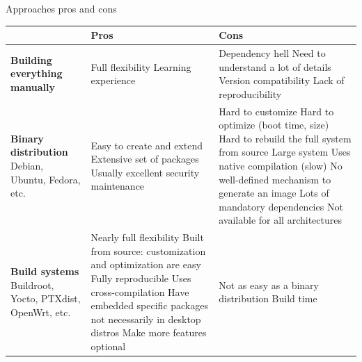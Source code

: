 \begin{frame}{Approaches pros and cons}
  \begin{center}
  \tiny
  \begin{tabularx}{13cm}{|X|X|X|}
    \hline
    & {\bf Pros} & {\bf Cons} \\
    \hline
    {\bf Building everything manually} &
    Full flexibility \newline
    Learning experience &
    Dependency hell \newline
    Need to understand a lot of details \newline
    Version compatibility \newline
    Lack of reproducibility \\
    \hline
    {\bf Binary distribution} \newline Debian, Ubuntu, Fedora, etc.
    &
    Easy to create and extend \newline
    Extensive set of packages \newline
    Usually excellent security maintenance
    &
    Hard to customize \newline
    Hard to optimize (boot time, size) \newline
    Hard to rebuild the full system from source \newline
    Large system \newline
    Uses native compilation (slow) \newline
    No well-defined mechanism to generate an image \newline
    Lots of mandatory dependencies \newline
    Not available for all architectures \\
    \hline
    {\bf Build systems} \newline Buildroot, Yocto, PTXdist, OpenWrt, etc.
    &
    Nearly full flexibility \newline
    Built from source: customization and optimization are easy \newline
    Fully reproducible \newline
    Uses cross-compilation \newline
    Have embedded specific packages not necessarily in desktop distros \newline
    Make more features optional
    &
    Not as easy as a binary distribution \newline
    Build time \\
    \hline
  \end{tabularx}
  \end{center}
\end{frame}

